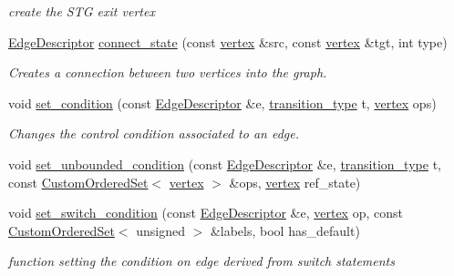 \begin{DoxyCompactItemize}
\begin{DoxyCompactList}\small\item\em create the S\+TG exit vertex \end{DoxyCompactList}\item 
\hyperlink{graph_8hpp_a9eb9afea34e09f484b21f2efd263dd48}{Edge\+Descriptor} \hyperlink{classStateTransitionGraph__constructor_a0a2687d3a0e392539bbcfcc6d7ebf49e}{connect\+\_\+state} (const \hyperlink{graph_8hpp_abefdcf0544e601805af44eca032cca14}{vertex} \&src, const \hyperlink{graph_8hpp_abefdcf0544e601805af44eca032cca14}{vertex} \&tgt, int type)
\begin{DoxyCompactList}\small\item\em Creates a connection between two vertices into the graph. \end{DoxyCompactList}\item 
void \hyperlink{classStateTransitionGraph__constructor_a132a775bfa939e1d2cfb8c45e0051ffa}{set\+\_\+condition} (const \hyperlink{graph_8hpp_a9eb9afea34e09f484b21f2efd263dd48}{Edge\+Descriptor} \&e, \hyperlink{state__transition__graph_8hpp_a73ce4c522d9c8d45a7e1ab48c95a1710}{transition\+\_\+type} t, \hyperlink{graph_8hpp_abefdcf0544e601805af44eca032cca14}{vertex} ops)
\begin{DoxyCompactList}\small\item\em Changes the control condition associated to an edge. \end{DoxyCompactList}\item 
void \hyperlink{classStateTransitionGraph__constructor_ad3423413ff2907841528859244909c55}{set\+\_\+unbounded\+\_\+condition} (const \hyperlink{graph_8hpp_a9eb9afea34e09f484b21f2efd263dd48}{Edge\+Descriptor} \&e, \hyperlink{state__transition__graph_8hpp_a73ce4c522d9c8d45a7e1ab48c95a1710}{transition\+\_\+type} t, const \hyperlink{classCustomOrderedSet}{Custom\+Ordered\+Set}$<$ \hyperlink{graph_8hpp_abefdcf0544e601805af44eca032cca14}{vertex} $>$ \&ops, \hyperlink{graph_8hpp_abefdcf0544e601805af44eca032cca14}{vertex} ref\+\_\+state)
\item 
void \hyperlink{classStateTransitionGraph__constructor_a64be826df3ddbeb51847bf1b350a2995}{set\+\_\+switch\+\_\+condition} (const \hyperlink{graph_8hpp_a9eb9afea34e09f484b21f2efd263dd48}{Edge\+Descriptor} \&e, \hyperlink{graph_8hpp_abefdcf0544e601805af44eca032cca14}{vertex} op, const \hyperlink{classCustomOrderedSet}{Custom\+Ordered\+Set}$<$ unsigned $>$ \&labels, bool has\+\_\+default)
\begin{DoxyCompactList}\small\item\em function setting the condition on edge derived from switch statements \end{DoxyCompactList}\item 

\end{DoxyCompactItemize}
